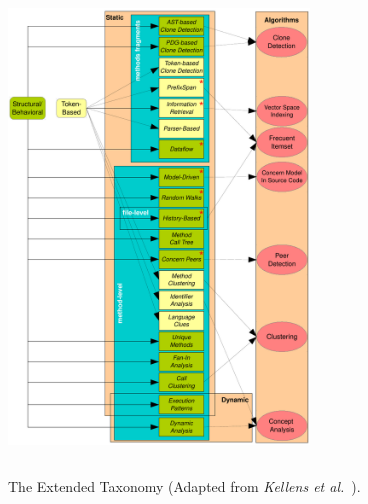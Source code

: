 



\begin{figure}
\centering
  \includegraphics[width=8cm, height=13cm]{figuras/taxonomy}
\caption{The Extended Taxonomy (Adapted from \textit{Kellens et al.}~\cite{Kellens}).}
\label{taxonomy}
\end{figure} 